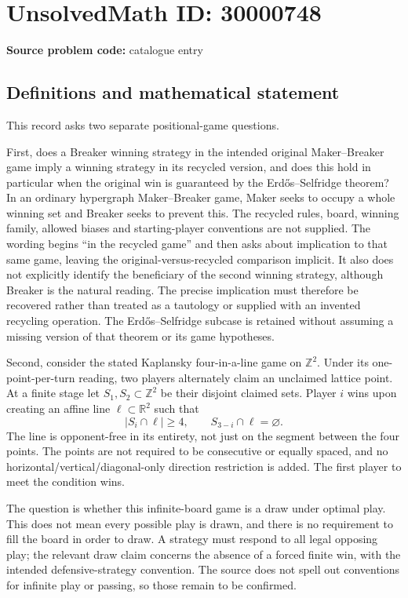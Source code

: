 \documentclass[11pt]{article}
\newcommand{\Z}{\mathbb{Z}}
\newcommand{\R}{\mathbb{R}}
\begin{document}
\section*{UnsolvedMath ID: 30000748}
\textbf{Source problem code:} catalogue entry
\subsection{Definitions and mathematical statement}
This record asks two separate positional-game questions.

First, does a Breaker winning strategy in the intended original Maker--Breaker game imply a winning strategy in its recycled version, and does this hold in particular when the original win is guaranteed by the Erd\H{o}s--Selfridge theorem? In an ordinary hypergraph Maker--Breaker game, Maker seeks to occupy a whole winning set and Breaker seeks to prevent this. The recycled rules, board, winning family, allowed biases and starting-player conventions are not supplied. The wording begins ``in the recycled game'' and then asks about implication to that same game, leaving the original-versus-recycled comparison implicit. It also does not explicitly identify the beneficiary of the second winning strategy, although Breaker is the natural reading. The precise implication must therefore be recovered rather than treated as a tautology or supplied with an invented recycling operation. The Erd\H{o}s--Selfridge subcase is retained without assuming a missing version of that theorem or its game hypotheses.

Second, consider the stated Kaplansky four-in-a-line game on \(\Z^2\). Under its one-point-per-turn reading, two players alternately claim an unclaimed lattice point. At a finite stage let \(S_1,S_2\subset\Z^2\) be their disjoint claimed sets. Player \(i\) wins upon creating an affine line \(\ell\subset\R^2\) such that
\[
 |S_i\cap\ell|\geq4,\qquad S_{3-i}\cap\ell=\varnothing.
\]
The line is opponent-free in its entirety, not just on the segment between the four points. The points are not required to be consecutive or equally spaced, and no horizontal/vertical/diagonal-only direction restriction is added. The first player to meet the condition wins.

The question is whether this infinite-board game is a draw under optimal play. This does not mean every possible play is drawn, and there is no requirement to fill the board in order to draw. A strategy must respond to all legal opposing play; the relevant draw claim concerns the absence of a forced finite win, with the intended defensive-strategy convention. The source does not spell out conventions for infinite play or passing, so those remain to be confirmed.
\end{document}
